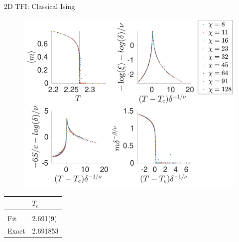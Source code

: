 \begin{frame}{2D TFI: Classical Ising}
    \begin{minipage}{.75\textwidth}
        \begin{figure}
            \center
            \includegraphics[height=\textheight]{../Figuren/phasediag/g0/zoomed_small.pdf}
        \end{figure}
    \end{minipage}
    \begin{minipage}{.24\textwidth}
        \begin{table}[]
            \begin{tabular}{l|l }
                      & $T_c$    \\
                \hline           \\
                Fit   & 2.691(9) \\
                Exact & 2.691853 \\

            \end{tabular}
        \end{table}
    \end{minipage}
\end{frame}
